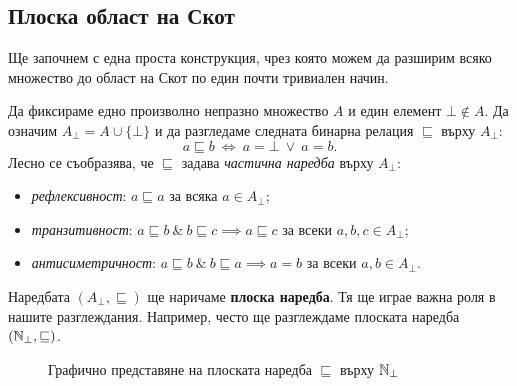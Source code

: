 \subsection{Плоска област на Скот}


Ще започнем с една проста конструкция, чрез която можем да разширим всяко множество до област на Скот по един почти тривиален начин.

Да фиксираме едно произволно непразно множество $A$ и един елемент $\bot \not \in A$.
Да означим $A_\bot = A \cup \{\bot\}$ и да разгледаме следната бинарна релация $\sqsubseteq$ върху $A_\bot$:
\[a \sqsubseteq b\ \iff\ a = \bot\ \vee\ a = b.\]
Лесно се съобразява, че $\sqsubseteq$ задава {\em частична наредба} върху $A_\bot$:
\begin{itemize}
\item 
  {\em рефлексивност}: $a \sqsubseteq a$ за всяка $a \in A_\bot$;
\item
  {\em транзитивност}: $a \sqsubseteq b\ \&\ b \sqsubseteq c \implies a\sqsubseteq c$ за всеки $a,b,c \in A_\bot$;
\item
  {\em антисиметричност}: $a \sqsubseteq b\ \&\ b\sqsubseteq a \implies a = b$ за всеки $a,b \in A_\bot$.
\end{itemize}

Наредбата $(A_\bot, \sqsubseteq)$ ще наричаме {\bf плоска наредба}. Тя ще играе важна роля в нашите разглеждания.
Например, често ще разглеждаме плоската наредба $(\mathbb{N}_\bot, \sqsubseteq)$.

\begin{framed}
  \begin{figure}[H]
    \label{fig:flat-nat-1}
    \centering
    \caption{Графично представяне на плоската наредба $\sqsubseteq$ върху $\mathbb{N}_\bot$}
  \end{figure}
  \end{framed}

